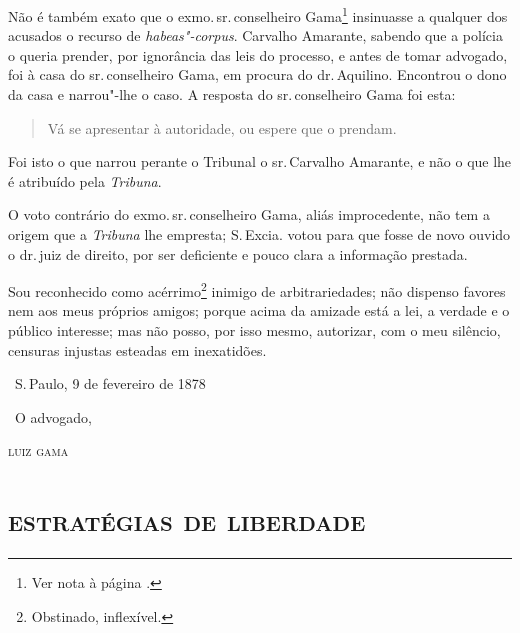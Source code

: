 Não é também exato que o exmo.\,sr.\,conselheiro Gama\footnote{Ver nota à página \pageref{agostinho}.} insinuasse a
qualquer dos acusados o recurso de \emph{habeas"-corpus}. Carvalho
Amarante, sabendo que a polícia o queria prender, por ignorância das
leis do processo, e antes de tomar advogado, foi à casa do sr.\,conselheiro Gama, em procura do dr.\,Aquilino. Encontrou o dono da casa e
narrou"-lhe o caso. A resposta do sr.\,conselheiro Gama foi esta:

\begin{quote}
Vá se apresentar à autoridade, ou espere que o prendam.
\end{quote}

Foi isto o que narrou perante o Tribunal o sr.\,Carvalho Amarante, e não
o que lhe é atribuído pela \emph{Tribuna}.

O voto contrário do exmo.\,sr.\,conselheiro Gama, aliás improcedente, não
tem a origem que a \emph{Tribuna} lhe empresta; S.\,Excia. votou para que
fosse de novo ouvido o dr.\,juiz de direito, por ser deficiente e pouco
clara a informação prestada.

Sou reconhecido como acérrimo\footnote{Obstinado, inflexível.}
inimigo de arbitrariedades;
não dispenso favores nem aos meus próprios amigos; porque acima da
amizade está a lei, a verdade e o público interesse; mas não posso, por
isso mesmo, autorizar, com o meu silêncio, censuras injustas esteadas em
inexatidões.

\bigskip

\hfill\ S.\,Paulo, 9 de fevereiro de 1878\smallskip

\hfill\ O advogado,

\hfill\textsc{luiz gama}


\pagebreak
\thispagestyle{empty}
\movetooddpage
\thispagestyle{empty}
\begingroup\makeatletter\@openrightfalse
\part{\textsc{estratégias de liberdade}}

\mbox{}\vfill
\thispagestyle{empty}

